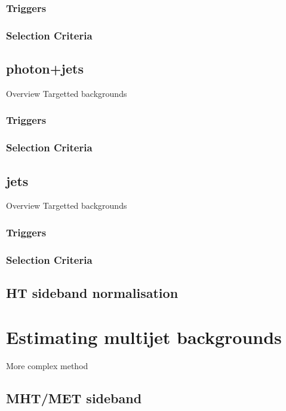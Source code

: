 \subsubsection{Triggers}
\subsubsection{Selection Criteria}

\subsection{photon+jets}
Overview
Targetted backgrounds
\subsubsection{Triggers}
\subsubsection{Selection Criteria}

\subsection{jets}
Overview
Targetted backgrounds
\subsubsection{Triggers}
\subsubsection{Selection Criteria}

\subsection{HT sideband normalisation}

\section{Estimating multijet backgrounds}  %
\label{sec:background_qcd}
More complex method
\subsection{MHT/MET sideband}


